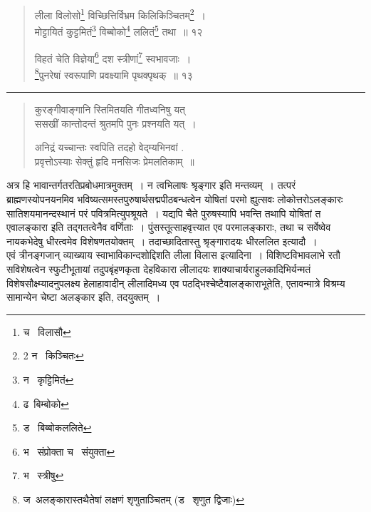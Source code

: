 \documentclass[11pt, openany]{book}
\begin{document}
\begin{quote}
 {\na लीला विलोसो\renewcommand{\thefootnote}{1}\footnote{च \textendash\ विलासौ } विच्छित्तिर्विभ्रम किलिकिञ्चितम्\renewcommand{\thefootnote}{2}\footnote{2 न \textendash\ किञ्चितः}~।\\
 मोट्टायितं कुट्टमितं\renewcommand{\thefootnote}{3}\footnote{न \textendash\ कृट्टिमितं} विब्बोको\renewcommand{\thefootnote}{4}\footnote{ढ\textendash\ बिम्बोको } ललितं\renewcommand{\thefootnote}{5}\footnote{ड \textendash\ बिब्बोकललिते} तथा~॥ १२ 

 विहतं चेति विज्ञेया\renewcommand{\thefootnote}{6}\footnote{भ \textendash\ संप्रोक्ता च \textendash\ संयुक्ता} दश स्त्रीणां\renewcommand{\thefootnote}{7}\footnote{भ \textendash\ स्त्रीषु} स्वभावजाः~।\\ 
 \renewcommand{\thefootnote}{8}\footnote{ज\textendash\ अलङ्कारास्तथैतेषां लक्षणं शृणुताञ्चितम् (ड \textendash\ शृणुत द्विजाः) }पुनरेषां स्वरूपाणि प्रवक्ष्यामि पृथक्पृथक्~॥ १३}
\end{quote}
 
\hrule
 
\begin{quote}
 {\qt कुरङ्गीवाङ्गानि स्तिमितयति गीतध्वनिषु यत्\\ 
 ससखीं कान्तोदन्तं श्रुतमपि पुनः प्रश्नयति यत्~। 

अनिद्रं यच्चान्तः स्वपिति तदहो वेद्म्यभिनवां . \\
 प्रवृत्तोऽस्याः सेक्तुं हृदि मनसिजः प्रेमलतिकाम्~॥ }
\end{quote} 


अत्र हि भावान्तर्गतरतिप्रबोधमात्रमुक्तम्~। न त्वभिलाषः श्रृङ्गार इति मन्तव्यम्~। तत्परं ब्राह्मणस्योपनयनमिव भविष्यत्समस्तपुरुषार्थसद्मपीठबन्धत्वेन योषितां परमो ह्युत्सवः लोकोत्तरोऽलङ्कारः सातिशयमानन्दस्थानं परं पवित्रमित्युपश्रूयते~। यद्यपि चैते पुरुषस्यापि भवन्ति तथापि योषितां त एवालङ्कारा इति तद्गतत्वेनैव वर्णिताः~। पुंसस्तूत्साहवृत्त्यात एव परमालङ्काराः, तथा च सर्वेष्वेव नायकभेदेषु धीरत्वमेव विशेषणतयोक्तम्~। तदाच्छादितास्तु श्रृङ्गारादयः धीरललित इत्यादौ~।\\

एवं त्रीनङ्गजान् व्याख्याय स्वाभाविकान्दशोद्दिशति लीला विलास इत्यादिना~। विशिष्टविभावलाभे रतौ सविशेषत्वेन स्फुटीभूतायां तदुपबृंहणकृता देहविकारा लीलादयः शाक्याचार्यराहुलकादिभिर्यन्मतं विशेषसौक्ष्म्यादनुपलक्ष्य हेलाहावादीन् लीलादिमध्य एव पठद्भिश्चेष्टैवालङ्काराभूतेति, एतावन्मात्रे विश्रम्य सामान्येन चेष्टा अलङ्कार इति, तदयुक्तम्~। 

\newpage
\end{document}
